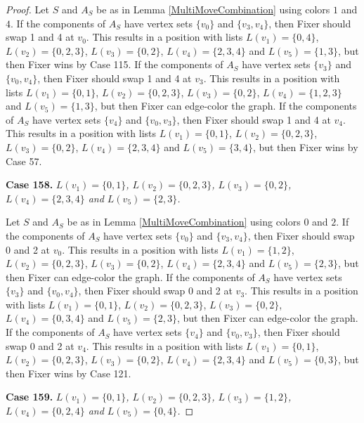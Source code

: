 \documentclass[12pt]{amsart}
\theoremstyle{plain}
\theoremstyle{definition}
\theoremstyle{remark}
\begin{document}
\begin{proof}
Let $S$ and $A_S$ be as in Lemma \ref{MultiMoveCombination} using colors $1$ and $4$. If the components of $A_S$ have vertex sets $\{v_0\}$ and $\{v_3, v_4\}$, then Fixer should swap 1 and 4 at $v_0$. This results in a position with lists $L(v_1) = \{0, 4\}$, $L(v_2) = \{0, 2, 3\}$, $L(v_3) = \{0, 2\}$, $L(v_4) = \{2, 3, 4\}$ and $L(v_5) = \{1, 3\}$, but then Fixer wins by Case 115.
If the components of $A_S$ have vertex sets $\{v_3\}$ and $\{v_0, v_4\}$, then Fixer should swap 1 and 4 at $v_3$. This results in a position with lists $L(v_1) = \{0, 1\}$, $L(v_2) = \{0, 2, 3\}$, $L(v_3) = \{0, 2\}$, $L(v_4) = \{1, 2, 3\}$ and $L(v_5) = \{1, 3\}$, but then Fixer can edge-color the graph.
If the components of $A_S$ have vertex sets $\{v_4\}$ and $\{v_0, v_3\}$, then Fixer should swap 1 and 4 at $v_4$. This results in a position with lists $L(v_1) = \{0, 1\}$, $L(v_2) = \{0, 2, 3\}$, $L(v_3) = \{0, 2\}$, $L(v_4) = \{2, 3, 4\}$ and $L(v_5) = \{3, 4\}$, but then Fixer wins by Case 57.

\noindent\textbf{Case 158.  }\textit{$L(v_1) = \{0, 1\}$, $L(v_2) = \{0, 2, 3\}$, $L(v_3) = \{0, 2\}$, $L(v_4) = \{2, 3, 4\}$ and $L(v_5) = \{2, 3\}$.}

Let $S$ and $A_S$ be as in Lemma \ref{MultiMoveCombination} using colors $0$ and $2$. If the components of $A_S$ have vertex sets $\{v_0\}$ and $\{v_3, v_4\}$, then Fixer should swap 0 and 2 at $v_0$. This results in a position with lists $L(v_1) = \{1, 2\}$, $L(v_2) = \{0, 2, 3\}$, $L(v_3) = \{0, 2\}$, $L(v_4) = \{2, 3, 4\}$ and $L(v_5) = \{2, 3\}$, but then Fixer can edge-color the graph.
If the components of $A_S$ have vertex sets $\{v_3\}$ and $\{v_0, v_4\}$, then Fixer should swap 0 and 2 at $v_3$. This results in a position with lists $L(v_1) = \{0, 1\}$, $L(v_2) = \{0, 2, 3\}$, $L(v_3) = \{0, 2\}$, $L(v_4) = \{0, 3, 4\}$ and $L(v_5) = \{2, 3\}$, but then Fixer can edge-color the graph.
If the components of $A_S$ have vertex sets $\{v_4\}$ and $\{v_0, v_3\}$, then Fixer should swap 0 and 2 at $v_4$. This results in a position with lists $L(v_1) = \{0, 1\}$, $L(v_2) = \{0, 2, 3\}$, $L(v_3) = \{0, 2\}$, $L(v_4) = \{2, 3, 4\}$ and $L(v_5) = \{0, 3\}$, but then Fixer wins by Case 121.

\noindent\textbf{Case 159.  }\textit{$L(v_1) = \{0, 1\}$, $L(v_2) = \{0, 2, 3\}$, $L(v_3) = \{1, 2\}$, $L(v_4) = \{0, 2, 4\}$ and $L(v_5) = \{0, 4\}$.}


\end{proof}
\end{document}
